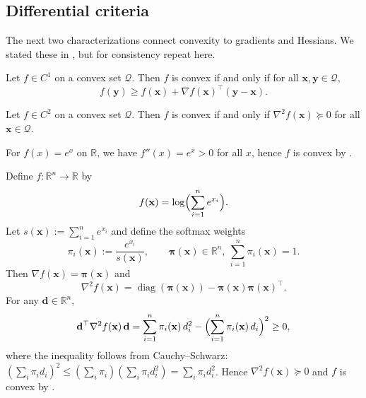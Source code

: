 \subsection{Differential criteria}
\label{sec:ch4-diff-criteria}
The next two characterizations connect convexity to gradients and Hessians. We stated these in
, but for consistency repeat here.

\begin{claim}
\label{clm:ch4-first-order}
Let $f\in C^1$ on a convex set $\mathcal{Q}$. Then $f$ is convex if and only if for all $\mathbf{x},\mathbf{y}\in\mathcal{Q}$,
\[
  f(\mathbf{y})\ge f(\mathbf{x})+\nabla f(\mathbf{x})^\top(\mathbf{y}-\mathbf{x}).
\]
\end{claim}

\begin{claim}
\label{clm:ch4-second-order}
Let $f\in C^2$ on a convex set $\mathcal{Q}$. Then $f$ is convex if and only if $\nabla^2 f(\mathbf{x})\succeq 0$
for all $\mathbf{x}\in\mathcal{Q}$.
\end{claim}

\begin{example}
For $f(x)=e^{x}$ on $\mathbb{R}$, we have $f''(x)=e^{x}>0$ for all $x$, hence $f$ is convex by .
\end{example}

\begin{example}
Define $f:\mathbb{R}^n\to\mathbb{R}$ by
\[
  f(\mathbf{x})=\log\Bigl(\sum_{i=1}^n e^{x_i}\Bigr).
\]
Let $s(\mathbf{x}):=\sum_{i=1}^n e^{x_i}$ and define the softmax weights
\[
  \pi_i(\mathbf{x}):=\frac{e^{x_i}}{s(\mathbf{x})},\qquad \boldsymbol{\pi}(\mathbf{x})\in\mathbb{R}^n,\ \sum_{i=1}^n\pi_i(\mathbf{x})=1.
\]
Then $\nabla f(\mathbf{x})=\boldsymbol{\pi}(\mathbf{x})$ and
\[
  \nabla^2 f(\mathbf{x})
  =\operatorname{diag}(\boldsymbol{\pi}(\mathbf{x}))-\boldsymbol{\pi}(\mathbf{x})\boldsymbol{\pi}(\mathbf{x})^\top.
\]
For any $\mathbf{d}\in\mathbb{R}^n$,
\[
  \mathbf{d}^\top \nabla^2 f(\mathbf{x})\,\mathbf{d}
  =\sum_{i=1}^n \pi_i(\mathbf{x})\,d_i^2-\Bigl(\sum_{i=1}^n \pi_i(\mathbf{x})\,d_i\Bigr)^2\ge 0,
\]
where the inequality follows from Cauchy--Schwarz:
$\left(\sum_i \pi_i d_i\right)^2\le \left(\sum_i \pi_i\right)\left(\sum_i \pi_i d_i^2\right)=\sum_i \pi_i d_i^2$.
Hence $\nabla^2 f(\mathbf{x})\succeq 0$ and $f$ is convex by .
\end{example}

